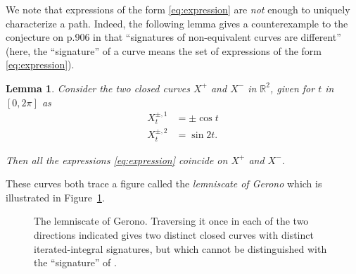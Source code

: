 \documentclass{scrartcl}
\theoremstyle{plain}
\newtheorem{lemma}[theorem]{Lemma}
\theoremstyle{definition}
\newcommand{\R}{\mathbb{R}}
\newcommand{\1}[1]{1_{\{#1\}}}
\begin{document}
We note that expressions of the form \eqref{eq:expression}
are \emph{not} enough to uniquely characterize a path.
Indeed, the following lemma gives a counterexample to the conjecture on p.906 in \cite{bib:FKK2010}
that ``signatures of non-equivalent curves are different''
(here, the ``signature'' of a curve means the set of expressions of the form \eqref{eq:expression}).
\begin{lemma}
  Consider the two closed curves $X^+$ and $X^-$ in $\R^2$, given for $t$ in $[0,2\pi]$ as%
  \begin{align*}
    X^{\pm,1}_t &=\pm\cos t\\
    X^{\pm,2}_t &=\sin 2t.
  \end{align*}

  Then all the expressions \eqref{eq:expression} coincide on $X^+$ and $X^-$.
\end{lemma}

These curves both trace a figure called the \emph{lemniscate of Gerono} which is illustrated in Figure~\ref{fig:lemniscate}.
\begin{figure}
\begin{center}
\end{center}	
	\caption{\label{fig:lemniscate}The lemniscate of Gerono. Traversing it once in each of the two directions indicated gives two distinct closed curves with distinct iterated-integral signatures, but which cannot be distinguished with the ``signature'' of \cite{bib:FKK2010}.}
\end{figure}
\end{document}
